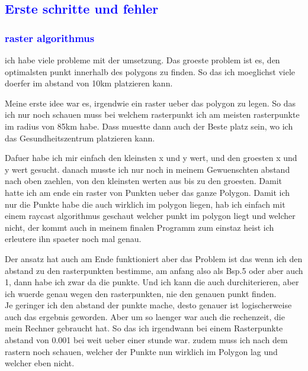 \documentclass{article}
\begin{document}
\subsection{\textcolor{blue}{Erste schritte und fehler}}
\subsubsection{\textcolor{blue}{raster algorithmus}}
ich habe viele probleme mit der umsetzung. Das groeste problem ist es, den optimalsten punkt innerhalb des polygons zu finden. So das ich moeglichst viele doerfer im abstand von 10km platzieren kann.
\par\medskip
 Meine erste idee war es, irgendwie ein raster ueber das polygon zu legen. So das ich nur noch schauen muss bei welchem rasterpunkt ich am meisten rasterpunkte im radius von 85km habe. Dass muestte dann auch der Beste platz sein, wo ich das Gesundheitszentrum platzieren kann.
\par\medskip
Dafuer habe ich mir einfach den kleinsten x und y wert, und den groesten x und y wert gesucht. danach musste ich nur noch in meinem Gewuenschten abstand nach oben zaehlen, von den kleinsten werten aus bis zu den groesten. Damit hatte ich am ende ein raster von Punkten ueber das ganze Polygon. Damit ich nur die Punkte habe die auch wirklich im polygon liegen, hab ich einfach mit einem raycast algorithmus geschaut welcher punkt im polygon liegt und welcher nicht, der kommt auch in meinem finalen Programm zum einstaz heist ich erleutere ihn spaeter noch mal genau.
\par\medskip
Der ansatz hat auch am Ende funktioniert aber das Problem ist das wenn ich den abstand zu den rasterpunkten bestimme, am anfang also als Bsp.5 oder aber auch 1, dann habe ich zwar da die punkte. Und ich kann die auch durchiterieren, aber ich wuerde genau wegen den rasterpunkten, nie den genauen punkt finden.
\\
 Je geringer ich den abstand der punkte mache, desto genauer ist logischerweise auch das ergebnis geworden. Aber um so laenger war auch die rechenzeit, die mein Rechner gebraucht hat. So das ich irgendwann bei einem Rasterpunkte abstand von 0.001 bei weit ueber einer stunde war. zudem muss ich nach dem rastern noch schauen, welcher der Punkte nun wirklich im Polygon lag und welcher eben nicht.
\par\medskip
\end{document}
